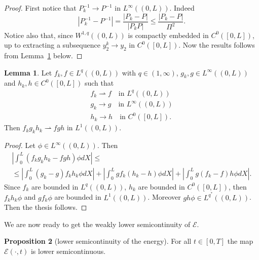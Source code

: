 \documentclass[a4paper,10pt,oneside]{amsbook}
\numberwithin{section}{chapter}
\numberwithin{equation}{chapter}
\theoremstyle{definition}
\newtheorem{prop}{Proposition}[chapter]
\newtheorem{lemma}[prop]{Lemma}
\begin{document}
\begin{proof}
First notice that $P_k^{-1}\to P^{-1}$ in $L^\infty((0,L))$. Indeed
\[
|P_k^{-1}-P^{-1}|=\frac{|P_k-P|}{|P_kP|}\le\frac{|P_k-P|}{\Pi^2}.
\]
Notice also that, since $W^{1,q}((0,L))$ is compactly embedded in $C^0([0,L])$, up to extracting a subsequence $y_2^k\to y_2$ in $C^0([0,L])$. Now the results follows from Lemma~\ref{lemma:lemmetto-cretino} below.
\end{proof}
\begin{lemma}
\label{lemma:lemmetto-cretino}
Let $f_k,f\in L^q((0,L))$  with $q\in(1,\infty)$, $g_k,g\in L^\infty((0,L))$ and $h_k,h\in C^0([0,L])$ such that
\begin{gather*}
f_k\rightharpoonup f\quad\text{in $L^q((0,L))$} \\
g_k\to g\quad\text{in $L^\infty((0,L))$} \\
h_k\to h\quad\text{in $C^0([0,L])$}.
\end{gather*}
Then $f_kg_kh_k\rightharpoonup fgh$ in $L^1((0,L))$.
\end{lemma}
\begin{proof}
Let $\phi\in L^\infty((0,L))$. Then
\begin{multline*}
\left|\int_0^L(f_kg_kh_k-fgh)\phi dX\right|\le\\
\le\left|\int_0^L(g_k-g)f_kh_k\phi dX\right|+\left|\int_0^Lgf_k(h_k-h)\phi dX\right|+\left|\int_0^Lg(f_k-f)h\phi dX\right|.
\end{multline*}
Since $f_k$ are bounded in $L^q((0,L))$, $h_k$ are bounded in $C^0([0,L])$, then $f_kh_k\phi$ and $gf_k\phi$ are bounded in $L^1((0,L))$. Moreover $gh\phi\in L^{q^*}((0,L))$. Then the thesis follows.
\end{proof}
We are now ready to get the weakly lower semicontinuity of $\mathcal{E}$.
\begin{prop}[lower semicontinuity of the energy]
For all $t\in[0,T]$ the map $\mathcal{E}(\cdot,t)$ is lower semicontinuous.
\end{prop}
\end{document}
